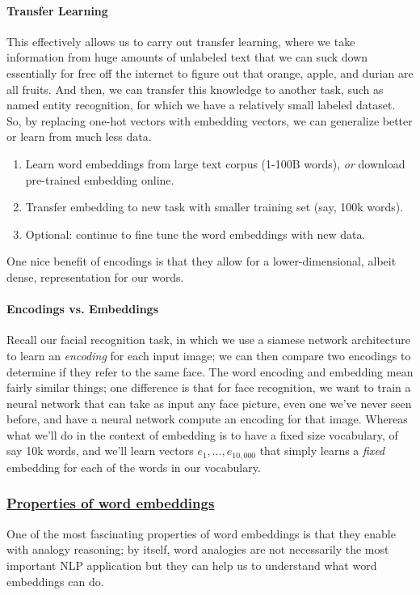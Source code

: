 \documentclass[12pt]{article}
\begin{document}
\paragraph{Transfer Learning}
This effectively allows us to carry out transfer learning, where we take information from huge amounts of unlabeled text that we can suck down essentially for free off the internet to figure out that orange, apple, and durian are all fruits. And then, we can transfer this knowledge to another task, such as named entity recognition, for which we have a relatively small labeled dataset. So, by replacing one-hot vectors with embedding vectors, we can generalize better or learn from much less data.
\begin{enumerate}
  \item Learn word embeddings from large text corpus (1-100B words), \emph{or}     download pre-trained embedding online.
\item Transfer embedding to new task with smaller training set (say, 100k   words).
\item Optional: continue to fine tune the word embeddings with new data.
\end{enumerate}
One nice benefit of encodings is that they allow for a lower-dimensional, albeit dense, representation for our words.

\paragraph{Encodings vs. Embeddings} Recall our facial recognition task, in which we use a siamese network architecture to learn an \emph{encoding} for each input image; we can then compare two encodings to determine if they refer to the same face. The word encoding and embedding mean fairly similar things; one difference is that for face recognition, we want to train a neural network that can take as input any face picture, even one we've never seen before, and have a neural network compute an encoding for that image. Whereas what we'll do in the context of embedding is to have a fixed size vocabulary, of say 10k words, and we'll learn vectors $e_1, \ldots, e_{10,000}$ that simply learns a \emph{fixed} embedding for each of the words in our vocabulary.

\subsubsection{\href{https://www.aclweb.org/anthology/N13-1090/}{Properties of word embeddings}}
One of the most fascinating properties of word embeddings is that they enable
with analogy reasoning; by itself, word analogies are not necessarily the most important NLP application but they can help us to understand what word embeddings can do.
\end{document}
